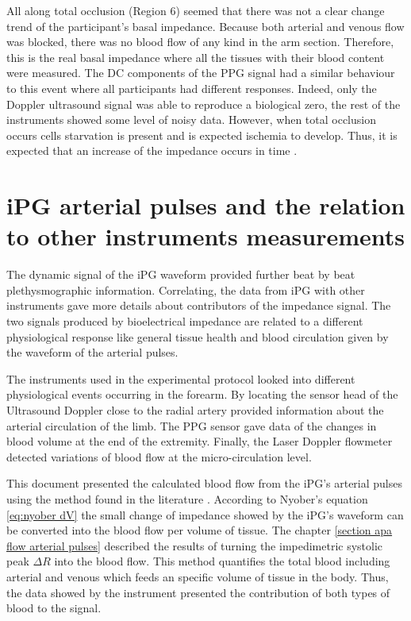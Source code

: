 
All along total occlusion (Region 6) seemed that there was not a clear change trend of the participant's basal impedance. Because both arterial and venous flow was blocked, there was no blood flow of any kind in the arm section. Therefore, this is the real basal impedance where all the tissues with their blood content were measured. The DC components of the PPG signal had a similar behaviour to this event where all participants had different responses. Indeed, only the Doppler ultrasound signal was able to reproduce a biological zero, the rest of the instruments showed some level of noisy data. However, when total occlusion occurs cells starvation is present and is expected ischemia to develop. Thus, it is expected that an increase of the impedance occurs in time .

\section{iPG arterial pulses and the relation to other instruments measurements} %
\label{section discussion 2}
The dynamic signal of the iPG waveform provided further beat by beat plethysmographic information. Correlating, the data from iPG with other instruments gave more details about contributors of the impedance signal. The two signals produced by bioelectrical impedance are related to a different physiological response like general tissue health and blood circulation given by the waveform of the arterial pulses. 

The instruments used in the experimental protocol looked into different physiological events occurring in the forearm. By locating the sensor head of the Ultrasound Doppler close to the radial artery provided information about the arterial circulation of the limb. The PPG sensor gave data of the changes in blood volume at the end of the extremity. Finally, the Laser Doppler flowmeter detected variations of blood flow at the micro-circulation level. 

This document presented the calculated blood flow from the iPG's arterial pulses using the method found in the literature \cite{corciova2011peripheral, porter1985measurement, brown1975impedance, marks1985computer}. According to Nyober's equation \ref{eq:nyober dV} the small change of impedance showed by the iPG's waveform can be converted into the blood flow per volume of tissue. The chapter \ref{section apa flow arterial pulses} described the results of turning the impedimetric systolic peak $\Delta R$ into the blood flow. This method quantifies the total blood including arterial and venous which feeds an specific volume of tissue in the body. Thus, the data showed by the instrument presented the contribution of both types of blood to the signal. 


